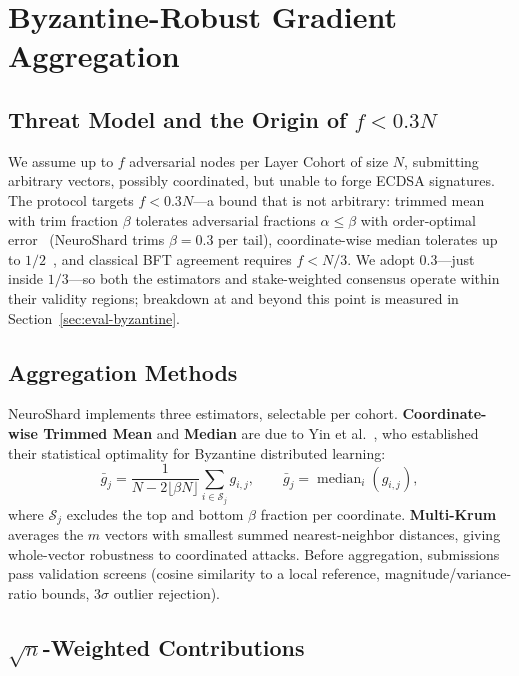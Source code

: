 \documentclass[conference]{IEEEtran}
\begin{document}
\section{Byzantine-Robust Gradient Aggregation}
\label{sec:byzantine}

\subsection{Threat Model and the Origin of $f < 0.3N$}

We assume up to $f$ adversarial nodes per Layer Cohort of size $N$, submitting arbitrary vectors, possibly coordinated, but unable to forge ECDSA signatures. The protocol targets $f < 0.3N$---a bound that is not arbitrary: trimmed mean with trim fraction $\beta$ tolerates adversarial fractions $\alpha \le \beta$ with order-optimal error~\cite{yin2018byzantine} (NeuroShard trims $\beta{=}0.3$ per tail), coordinate-wise median tolerates up to $1/2$~\cite{yin2018byzantine}, and classical BFT agreement requires $f < N/3$. We adopt $0.3$---just inside $1/3$---so both the estimators and stake-weighted consensus operate within their validity regions; breakdown at and beyond this point is measured in Section~\ref{sec:eval-byzantine}.

\subsection{Aggregation Methods}

NeuroShard implements three estimators, selectable per cohort. \textbf{Coordinate-wise Trimmed Mean} and \textbf{Median} are due to Yin et al.~\cite{yin2018byzantine}, who established their statistical optimality for Byzantine distributed learning:
\begin{equation}
\bar{g}_j = \frac{1}{N - 2\lfloor \beta N \rfloor} \sum_{i \in \mathcal{S}_j} g_{i,j},
\qquad
\bar{g}_j = \operatorname{median}_i(g_{i,j}), \label{eq:robust}
\end{equation}
where $\mathcal{S}_j$ excludes the top and bottom $\beta$ fraction per coordinate. \textbf{Multi-Krum}~\cite{blanchard2017machine} averages the $m$ vectors with smallest summed nearest-neighbor distances, giving whole-vector robustness to coordinated attacks. Before aggregation, submissions pass validation screens (cosine similarity to a local reference, magnitude/variance-ratio bounds, $3\sigma$ outlier rejection).

\subsection{$\sqrt{n}$-Weighted Contributions}
\label{sec:sqrtn}
\end{document}
